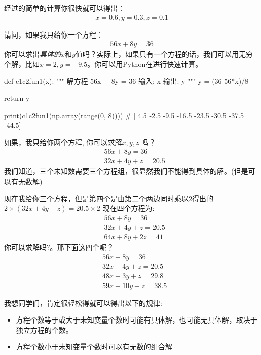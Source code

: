 \documentclass[12pt]{article}
\numberwithin{figure}{section}
\numberwithin{equation}{section}
\begin{document}
经过的简单的计算你很快就可以得出：
\begin{align*}
	x = 0.6, y = 0.3, z = 0.1 
\end{align*}

\begin{example}
请问，如果我只给你一个方程：
\begin{align*}
	56x + 8y = 36 
\end{align*}	
你可以求出\textit{具体的}$x$和$y$值吗？实际上，如果只有一个方程的话，我们可以用无穷个解，比如$x=2, y = -9.5$。你可以用Python在进行快速计算。
\begin{python}
def c1c2fun1(x):
    """
    解方程 56x + 8y = 36
    输入: x
    输出: y
    """
    y = (36-56*x)/8

    return y
    

print(c1c2fun1(np.array(range(0, 8))))
# [ 4.5 -2.5  -9.5 -16.5 -23.5 -30.5 -37.5 -44.5]
\end{python}
\end{example}

\begin{example}
如果，我只给你两个方程, 你可以求解$x, y, z$ 吗？
\begin{align*}
	& 56x + 8 y = 36 \\
	& 32 x + 4 y + z = 20.5 
\end{align*}
我们知道，三个未知数需要三个方程组，很显然我们不能得到具体的解。(但是可以有无数解)
\end{example}

\begin{example}
现在我给你三个方程，但是第四个是由第二个两边同时乘以$2$得出的 $2 \times ( 32x + 4y + z) = 20.5 \times 2$
现在四个方程为:
\begin{align*}
	& 56x + 8 y = 36 \\
	& 32 x + 4 y + z = 20.5 \\
	& 64x + 8y + 2z = 41 
\end{align*}
你可以求解吗?。那下面这四个呢？
\begin{align*}
	& 56x + 8 y = 36 \\
	& 32 x + 4 y + z = 20.5 \\
	& 48 x + 3y + z = 29.8  \\
	& 59 x + 10y + z = 38.5
\end{align*}
\end{example}

我想同学们，肯定很轻松得就可以得出以下的规律:
\begin{itemize}
	\item 方程个数等于或大于未知变量个数时可能有具体解，也可能无具体解，取决于独立方程的个数。
	\item 方程个数小于未知变量个数时可以有无数的组合解
\end{itemize}
\end{document}
